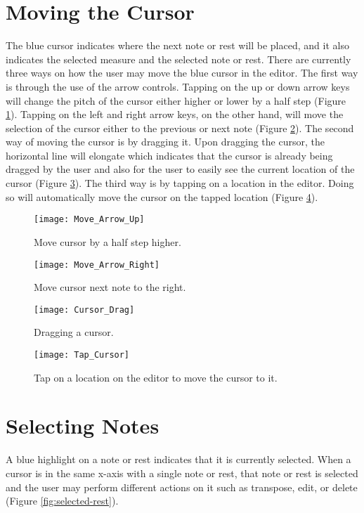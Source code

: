 \section{Moving the Cursor}
The blue cursor indicates where the next note or rest will be placed, and it also indicates the selected measure and the selected note or rest. There are currently three ways on how the user may move the blue cursor in the editor. The first way is through the use of the arrow controls. Tapping on the up or down arrow keys will change the pitch of the cursor either higher or lower by a half step (Figure \ref{fig:move-arrow-up}). Tapping on the left and right arrow keys, on the other hand, will move the selection of the cursor either to the previous or next note (Figure \ref{fig:move-arrow-right}). The second way of moving the cursor is by dragging it. Upon dragging the cursor, the horizontal line will elongate which indicates that the cursor is already being dragged by the user and also for the user to easily see the current location of the cursor (Figure \ref{fig:cursor-drag}). The third way is by tapping on a location in the editor. Doing so will automatically move the cursor on the tapped location (Figure \ref{fig:cursor-tap}).

\begin{figure}[H]
  \centering
  \texttt{[image: Move\_Arrow\_Up]}
    \caption{Move cursor by a half step higher.}
    \label{fig:move-arrow-up}
\end{figure}

\begin{figure}[H]
  \centering
  \texttt{[image: Move\_Arrow\_Right]}
    \caption{Move cursor next note to the right.}
    \label{fig:move-arrow-right}
\end{figure}

\begin{figure}[H]
  \centering
  \texttt{[image: Cursor\_Drag]}
    \caption{Dragging a cursor.}
    \label{fig:cursor-drag}
\end{figure}

\begin{figure}[H]
  \centering
  \texttt{[image: Tap\_Cursor]}
    \caption{Tap on a location on the editor to move the cursor to it.}
    \label{fig:cursor-tap}
\end{figure}

\section{Selecting Notes}
A blue highlight on a note or rest indicates that it is currently selected. When a cursor is in the same x-axis with a single note or rest, that note or rest is selected and the user may perform different actions on it such as transpose, edit, or delete (Figure \ref{fig:selected-rest}).

